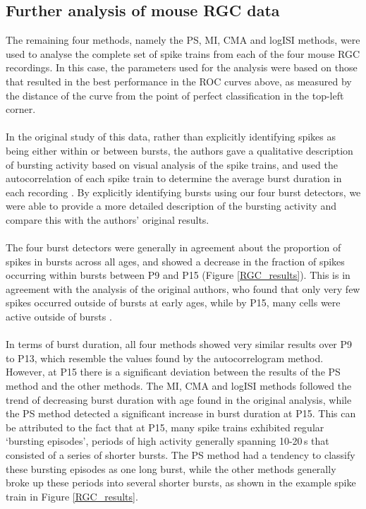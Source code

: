 \documentclass[12pt, titlepage]{article}
\begin{document}
	\subsection*{Further analysis of mouse RGC data}
	The remaining four methods, namely the PS, MI, CMA and logISI methods, were used to analyse the complete set of spike trains from each of the four mouse RGC recordings. In this case, the parameters used for the analysis were based on those that resulted in the best performance in the ROC curves above, as measured by the distance of the curve from the point of perfect classification in the top-left corner. 
	\\ \\In the original study of this data, rather than explicitly identifying spikes as being either within or between bursts, the authors gave a qualitative description of bursting activity based on visual analysis of the spike trains, and used the autocorrelation of each spike train to determine the average burst duration in each recording \cite{Demas2003}. By explicitly identifying bursts using our four burst detectors, we were able to provide a more detailed description of the bursting activity and compare this with the authors' original results.
	\\ \\ The four burst detectors were generally in agreement about the proportion of spikes in bursts across all ages, and showed a decrease in the fraction of spikes occurring within bursts between P9 and P15 (Figure \ref{RGC_results}). This is in agreement with the analysis of the original authors, who found that only very few spikes occurred outside of bursts at early ages, while by P15, many cells were active outside of bursts \cite{Demas2003}.
	\\ \\In terms of burst duration, all four methods showed very similar results over P9 to P13, which resemble the values found by the autocorrelogram method. However, at P15 there is a significant deviation between the results of the PS method and the other methods. The MI, CMA and logISI methods followed the trend of decreasing burst duration with age found in the original analysis, while the PS method detected a significant increase in burst duration at P15. This can be attributed to the fact that at P15, many spike trains exhibited regular `bursting episodes', periods of high activity generally spanning 10-20$\,$s that consisted of a series of shorter bursts. The PS method had a tendency to classify these bursting episodes as one long burst, while the other methods generally broke up these periods into several shorter bursts, as shown in the example spike train in Figure \ref{RGC_results}. 
\end{document}
